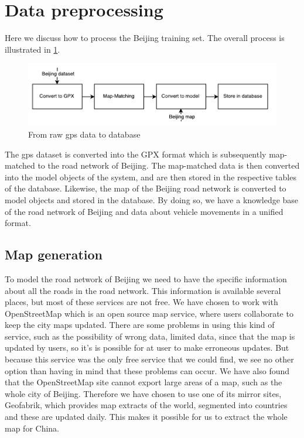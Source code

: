 \section{Data preprocessing}
Here we discuss how to process the Beijing training set. The overall process is illustrated in \ref{fig:data-processing}.

\begin{figure}[h!]
  \centering
    \includegraphics[width=1\textwidth]{figures/data-processing.pdf}
    \caption{From raw gps data to database}
    \label{fig:data-processing}
\end{figure}

The gps dataset is converted into the GPX format which is subsequently map-matched to the road network of Beijing. The map-matched data is then converted into the model objects of the system, and are then stored in the respective tables of the database. Likewise, the map of the Beijing road network is converted to model objects and stored in the database. By doing so, we have a knowledge base of the road network of Beijing and data about vehicle movements in a unified format.

\subsection{Map generation}\label{sec:mapgeneration}
To model the road network of Beijing we need to have the specific information about all the roads in the road network. This information is available several places, but most of these services are not free. We have chosen to work with OpenStreetMap which is an open source map service, where users collaborate to keep the city maps updated. There are some problems in using this kind of service, such as the possibility of wrong data, limited data, since that the map is updated by users, so it's is possible for at user to make erroneous updates. But because this service was the only free service that we could find, we see no other option than having in mind that these problems can occur. We have also found that the OpenStreetMap site cannot export large areas of a map, such as the whole city of Beijing. Therefore we have chosen to use one of its mirror sites, Geofabrik\cite{geofabrik}, which provides map extracts of the world, segmented into countries and these are updated daily. This makes it possible for us to extract the whole map for China.

